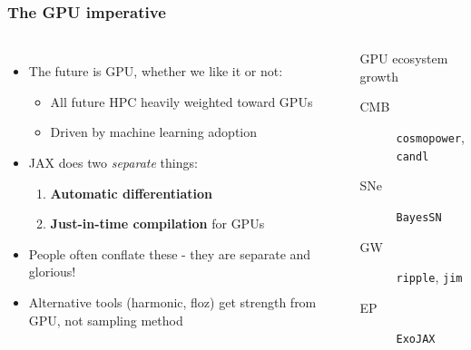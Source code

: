 \documentclass[aspectratio=169]{beamer}
\begin{document}
\begin{frame}
    \frametitle{The GPU imperative}
    \begin{columns}
        \begin{itemize}
            \item The future is GPU, whether we like it or not:
                \begin{itemize}
                    \item All future HPC heavily weighted toward GPUs
                    \item Driven by machine learning adoption
                \end{itemize}
            \item JAX does two \emph{separate} things:
                \begin{enumerate}
                    \item \textbf{Automatic differentiation}
                    \item \textbf{Just-in-time compilation} for GPUs
                \end{enumerate}
            \item People often conflate these - they are separate and glorious!
            \item Alternative tools (harmonic, floz) get strength from GPU, not sampling method
        \end{itemize}
        \begin{block}{GPU ecosystem growth}
            \begin{description}
                \item[CMB] \texttt{cosmopower}, \texttt{candl}
                \item[SNe] \texttt{BayesSN}
                \item[GW] \texttt{ripple}, \texttt{jim}
                \item[EP] \texttt{ExoJAX}
            \end{description}
        \end{block}
    \end{columns}
\end{frame}
\end{document}
